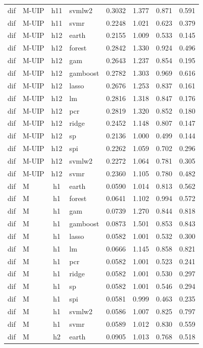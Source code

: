 \begin{ThreePartTable}
\begin{longtable}[t]{llclcccc}
dif & M-UIP & h11 & svmlw2 & 0.3032 & 1.377 & 0.871 & 0.591\\
dif & M-UIP & h11 & svmr & 0.2248 & 1.021 & 0.623 & 0.379\\
\addlinespace
dif & M-UIP & h12 & earth & 0.2155 & 1.009 & 0.533 & 0.145\\
dif & M-UIP & h12 & forest & 0.2842 & 1.330 & 0.924 & 0.496\\
dif & M-UIP & h12 & gam & 0.2643 & 1.237 & 0.854 & 0.195\\
dif & M-UIP & h12 & gamboost & 0.2782 & 1.303 & 0.969 & 0.616\\
dif & M-UIP & h12 & lasso & 0.2676 & 1.253 & 0.837 & 0.161\\
dif & M-UIP & h12 & lm & 0.2816 & 1.318 & 0.847 & 0.176\\
dif & M-UIP & h12 & pcr & 0.2819 & 1.320 & 0.852 & 0.180\\
dif & M-UIP & h12 & ridge & 0.2452 & 1.148 & 0.807 & 0.147\\
dif & M-UIP & h12 & sp & 0.2136 & 1.000 & 0.499 & 0.144\\
dif & M-UIP & h12 & spi & 0.2262 & 1.059 & 0.702 & 0.296\\
dif & M-UIP & h12 & svmlw2 & 0.2272 & 1.064 & 0.781 & 0.305\\
dif & M-UIP & h12 & svmr & 0.2360 & 1.105 & 0.780 & 0.482\\
\addlinespace
dif & M & h1 & earth & 0.0590 & 1.014 & 0.813 & 0.562\\
dif & M & h1 & forest & 0.0641 & 1.102 & 0.994 & 0.572\\
dif & M & h1 & gam & 0.0739 & 1.270 & 0.844 & 0.818\\
dif & M & h1 & gamboost & 0.0873 & 1.501 & 0.853 & 0.843\\
dif & M & h1 & lasso & 0.0582 & 1.001 & 0.532 & 0.300\\
dif & M & h1 & lm & 0.0666 & 1.145 & 0.858 & 0.821\\
dif & M & h1 & pcr & 0.0582 & 1.001 & 0.523 & 0.241\\
dif & M & h1 & ridge & 0.0582 & 1.001 & 0.530 & 0.297\\
dif & M & h1 & sp & 0.0582 & 1.001 & 0.546 & 0.294\\
dif & M & h1 & spi & 0.0581 & 0.999 & 0.463 & 0.235\\
dif & M & h1 & svmlw2 & 0.0586 & 1.007 & 0.825 & 0.797\\
dif & M & h1 & svmr & 0.0589 & 1.012 & 0.830 & 0.559\\
\addlinespace
dif & M & h2 & earth & 0.0905 & 1.013 & 0.768 & 0.518\\

\end{longtable}
\end{ThreePartTable}

